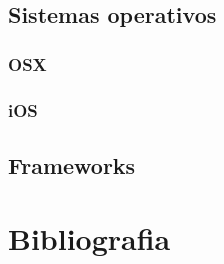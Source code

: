 	\section{Sistemas operativos}
		\subsection{OSX}
		\subsection{iOS}
	\section{Frameworks}
	
\chapter{Bibliografia}
